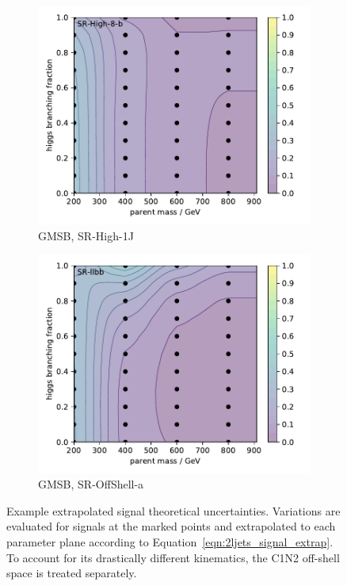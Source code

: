 \begin{figure}[tp]
\begin{subfigure}{0.495\textwidth}
\centering
\includegraphics[width=\textwidth]{figures/2ljets_signal_sys_gmsb_SRHigh8_2.pdf}
\caption{GMSB, SR-High-1J}
\end{subfigure}
\hfill
\begin{subfigure}{0.495\textwidth}
\centering
\includegraphics[width=\textwidth]{figures/2ljets_signal_sys_gmsb_SRllbb.pdf}
\caption{GMSB, SR-OffShell-a}
\end{subfigure}
\caption[
Example extrapolated signal theoretical uncertainties
]{%
Example extrapolated signal theoretical uncertainties.
Variations are evaluated for signals at the marked points and extrapolated to
each parameter plane according to Equation~\ref{eqn:2ljets_signal_extrap}.
To account for its drastically different kinematics, the C1N2 off-shell space
is treated separately.
}
\label{fig:2ljets_signal_sys_extrap}
\end{figure}

